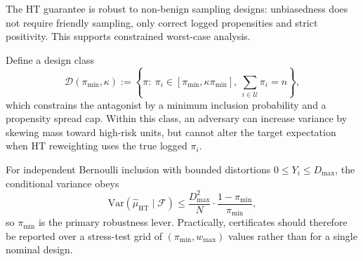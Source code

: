 The HT guarantee is robust to non-benign sampling designs: unbiasedness does not require friendly sampling, only correct logged propensities and strict positivity. This supports constrained worst-case analysis.

Define a design class
\[
\mathcal{D}(\pi_{\min},\kappa)
:=\left\{\pi:\ \pi_i\in[\pi_{\min},\kappa\pi_{\min}],\ \sum_{i\in\mathcal{U}}\pi_i=n\right\},
\]
which constrains the antagonist by a minimum inclusion probability and a propensity spread cap. Within this class, an adversary can increase variance by skewing mass toward high-risk units, but cannot alter the target expectation when HT reweighting uses the true logged $\pi_i$.

For independent Bernoulli inclusion with bounded distortions $0\le Y_i\le D_{\max}$, the conditional variance obeys
\[
\mathrm{Var}\!\left(\hat{\mu}_{\mathrm{HT}}\mid\mathcal{F}\right)
\le
\frac{D_{\max}^2}{N}\cdot \frac{1-\pi_{\min}}{\pi_{\min}},
\]
so $\pi_{\min}$ is the primary robustness lever. Practically, certificates should therefore be reported over a stress-test grid of $(\pi_{\min}, w_{\max})$ values rather than for a single nominal design.
